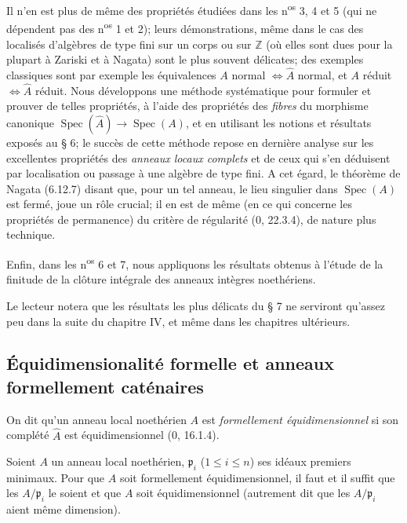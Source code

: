 Il n'en est plus de même des propriétés étudiées dans les
n\textsuperscript{os} 3, 4 et 5 (qui ne dépendent pas des
n\textsuperscript{os} 1 et 2); leurs démonstrations, même dans le cas des
localisés d'algèbres de type fini sur un corps ou sur $\mathbb Z$ (où elles
sont dues pour la plupart à Zariski et à Nagata) sont le plus souvent
délicates; des exemples classiques sont par exemple les équivalences
$A$ normal $\Longleftrightarrow \widehat A$ normal, et $A$ réduit
$\Longleftrightarrow \widehat A$ réduit. Nous développons une méthode
systématique pour formuler et prouver de telles propriétés, à l'aide des
propriétés des \emph{fibres} du morphisme canonique
$\operatorname{Spec}(\widehat A)\to\operatorname{Spec}(A)$, et en utilisant
les notions et résultats exposés au § 6; le succès de cette méthode repose en
dernière analyse sur les excellentes propriétés des \emph{anneaux locaux
complets} et
de ceux qui s'en déduisent par localisation ou passage à une algèbre de type
fini. A cet égard, le théorème de Nagata (6.12.7) disant que, pour un tel
anneau, le lieu singulier dans $\operatorname{Spec}(A)$ est fermé, joue un rôle
crucial; il en est de même (en ce qui concerne les propriétés de permanence)
du critère de régularité (0, 22.3.4), de nature plus technique.

Enfin, dans les n\textsuperscript{os} 6 et 7, nous appliquons les résultats
obtenus à l'étude de
la finitude de la clôture intégrale des anneaux intègres noethériens.

Le lecteur notera que les résultats les plus délicats du § 7 ne serviront
qu'assez peu dans la suite du chapitre IV, et même dans les chapitres
ultérieurs.

\subsection{Équidimensionalité formelle et anneaux formellement caténaires}
\label{subsection:IV.7.1-fr}


\begin{definition}[7.1.1]
\label{IV.2.s7.1.1-fr}
On dit qu'un anneau local noethérien $A$ est \emph{formellement
équidimensionnel} si son complété $\widehat A$ est équidimensionnel (0,
16.1.4).
\end{definition}

\begin{proposition}[7.1.2]
\label{IV.2.s7.1.2-fr}
Soient $A$ un anneau local noethérien, $\mathfrak p_i$ ($1\leqslant i\leqslant
n$) ses idéaux premiers minimaux. Pour que $A$ soit formellement
équidimensionnel, il faut et il suffit que les $A/\mathfrak p_i$ le soient et
que $A$ soit équidimensionnel (autrement dit que les $A/\mathfrak p_i$ aient
même dimension).
\end{proposition}


